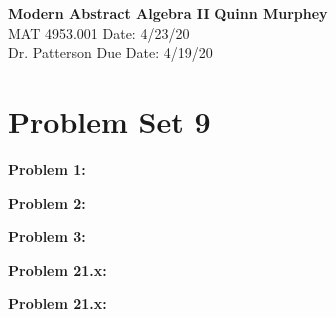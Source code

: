 \documentclass[letter paper, 12pt]{article}
\begin{document}
\noindent
\large\textbf{Modern Abstract Algebra II} \hfill \textbf{Quinn Murphey} \\
\normalsize MAT 4953.001 \hfill Date: 4/23/20 \\
Dr. Patterson \hfill Due Date: 4/19/20 \\
\noindent\makebox[\linewidth]{\rule{\paperwidth}{0.4pt}}

\section*{Problem Set 9}
\doublespacing
\noindent\textbf{Problem 1:}
    
    
    
    
    
\noindent\textbf{Problem 2:}
    
    
    
    
    
\noindent\textbf{Problem 3:}
    
    
    
    
    
\noindent\textbf{Problem 21.x:}
    
    
    
    
    
\noindent\textbf{Problem 21.x:}
    
    
    
    
    
\end{document}
